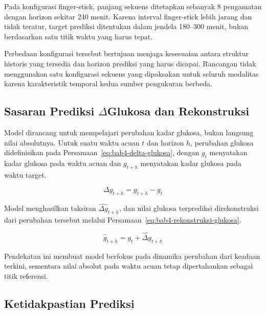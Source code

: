 Pada konfigurasi finger-stick, panjang sekuens ditetapkan sebanyak 8 pengamatan dengan horizon sekitar 240 menit. Karena interval finger-stick lebih jarang dan tidak teratur, target
prediksi ditentukan dalam jendela 180--300 menit, bukan berdasarkan satu titik waktu yang harus tepat.

Perbedaan konfigurasi tersebut bertujuan menjaga kesesuaian antara struktur historis yang tersedia dan horizon prediksi yang harus dicapai. Rancangan tidak menggunakan satu konfigurasi
sekuens yang dipaksakan untuk seluruh modalitas karena karakteristik temporal kedua sumber pengukuran berbeda.

\subsection{Sasaran Prediksi \texorpdfstring{$\Delta$}{Delta}Glukosa dan Rekonstruksi} 
\label{subsec:bab4-target-prediksi-rekonstruksi}

Model dirancang untuk mempelajari perubahan kadar glukosa, bukan langsung nilai absolutnya. Untuk suatu waktu acuan $t$ dan horizon $h$, perubahan glukosa didefinisikan pada Persamaan~\ref{eq:bab4-delta-glukosa}, dengan $g_t$ menyatakan kadar glukosa pada waktu acuan dan $g_{t+h}$ menyatakan kadar glukosa pada waktu target.

\begin{equation} \Delta g_{t+h} = g_{t+h} - g_t
    \label{eq:bab4-delta-glukosa}
\end{equation}

Model menghasilkan taksiran $\widehat{\Delta g}_{t+h}$, dan nilai glukosa terprediksi direkonstruksi dari perubahan tersebut melalui Persamaan~\ref{eq:bab4-rekonstruksi-glukosa}.

\begin{equation} \widehat{g}_{t+h} = g_t + \widehat{\Delta g}_{t+h}
    \label{eq:bab4-rekonstruksi-glukosa}
\end{equation}

Pendekatan ini membuat model berfokus pada dinamika perubahan dari keadaan terkini, sementara nilai absolut pada waktu acuan tetap dipertahankan sebagai titik referensi.

\subsection{Ketidakpastian Prediksi} 
\label{subsec:bab4-ketidakpastian-prediksi}

